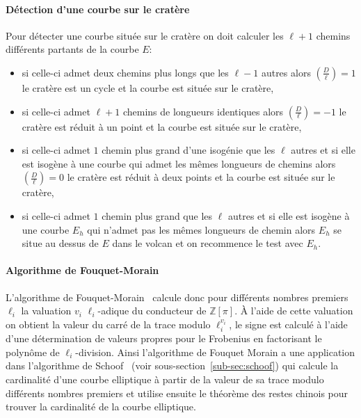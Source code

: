 \documentclass[10pt,a4paper]{book}
\theoremstyle{plain}
\theoremstyle{definition}
\theoremstyle{definition}
\theoremstyle{definition}
\theoremstyle{definition}
\theoremstyle{definition}
\theoremstyle{remark}
\theoremstyle{remark}
\theoremstyle{definition}
\begin{document}
\paragraph{Détection d'une courbe sur le cratère}
Pour détecter une courbe située sur le cratère on doit calculer les $\ell+1$ chemins différents partants de la courbe $E$:
\begin{itemize}
\item si celle-ci admet deux chemins plus longs que les $\ell-1$ autres alors 
$\left( \frac{D}{\ell} \right) = 1$ le cratère est un cycle et la courbe est
située sur le cratère,
\item si celle-ci admet $\ell+1$ chemins de longueurs identiques alors $\left( 
\frac{D}{\ell} \right) = -1$ le cratère est réduit à un point et la courbe est
située sur le cratère,
\item si celle-ci admet $1$ chemin plus grand d'une isogénie que les $\ell$ 
autres et si elle est isogène à une courbe qui admet les mêmes longueurs de 
chemins alors $\left( \frac{D}{\ell} \right) = 0$ le cratère est réduit à deux 
points et la courbe est située sur le cratère,
\item si celle-ci admet $1$ chemin plus grand que les $\ell$ autres et si elle 
est isogène à une courbe $E_h$ qui n'admet pas les mêmes longueurs de chemin 
alors $E_h$ se situe au dessus de $E$ dans le volcan et on recommence le test 
avec $E_h$.
\end{itemize}

\paragraph{Algorithme de Fouquet-Morain}
L'algorithme de Fouquet-Morain~\cite{FouquetMorain02} calcule donc pour 
différents nombres premiers $\ell_i$ la valuation $v_i$ $\ell_i$-adique du 
conducteur de $\mathbb{Z}[\pi]$. \`A l'aide de cette valuation on obtient la 
valeur du carré de la trace modulo $\ell_i^{v_i}$, le signe est calculé à 
l'aide d'une détermination de valeurs propres pour le Frobenius en factorisant 
le polynôme de $\ell_i$-division. Ainsi l'algorithme de Fouquet Morain a une 
application dans l'algorithme de Schoof~\cite{Schoof85} (voir 
sous-section~\ref{sub-sec:schoof}) qui calcule la cardinalité d'une courbe
elliptique à partir de la valeur de sa trace modulo différents nombres premiers
et utilise ensuite le théorème des restes chinois pour trouver la cardinalité 
de la courbe elliptique. 
\end{document}
